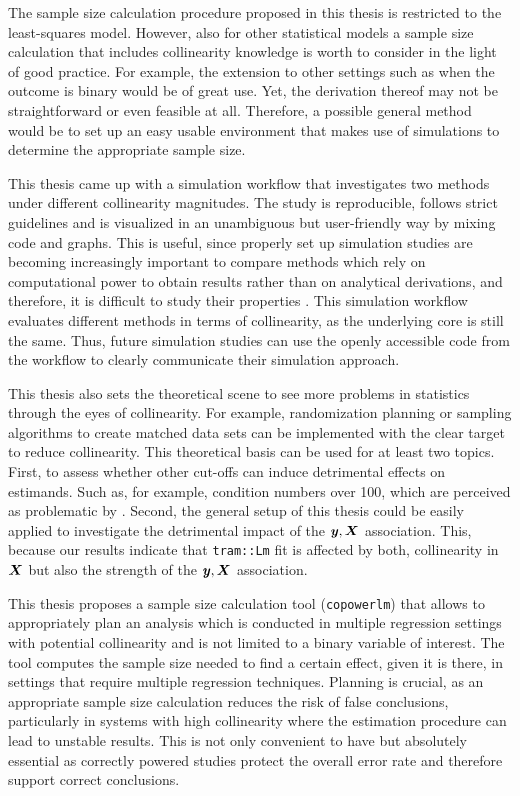 \documentclass[11pt,a4paper,twoside]{book}\usepackage[]{graphicx}\usepackage[]{xcolor}
\begin{document}
The sample size calculation procedure proposed in this thesis is restricted to the least-squares model.
However, also for other statistical models a sample size calculation that includes collinearity knowledge is worth to consider in the light of good practice.
For example, the extension to other settings such as when the outcome is binary would be of great use.
Yet, the derivation thereof may not be straightforward or even feasible at all.
Therefore, a possible general method would be to set up an easy usable environment that makes use of simulations to determine the appropriate sample size.

This thesis came up with a simulation workflow that investigates two methods under different collinearity magnitudes.
The study is reproducible, follows strict guidelines and is visualized in an unambiguous but user-friendly way by mixing code and graphs.
This is useful, since properly set up simulation studies are becoming increasingly important to compare methods which rely on computational power to obtain results rather than on analytical derivations, and therefore, it is difficult to study their properties \citep{Burton2006, Morris2019, pawel2022}.
This simulation workflow evaluates different methods in terms of collinearity, as the underlying core is still the same.
Thus, future simulation studies can use the openly accessible code from the workflow to clearly communicate their simulation approach.

This thesis also sets the theoretical scene to see more problems in statistics through the eyes of collinearity.
For example, randomization planning or sampling algorithms to create matched data sets can be implemented with the clear target to reduce collinearity.
This theoretical basis can be used for at least two topics.
First, to assess whether other cut-offs can induce detrimental effects on estimands.
Such as, for example, condition numbers over 100, which are perceived as problematic by \cite{montgomery}.
Second, the general setup of this thesis could be easily applied to investigate the detrimental impact of the ${\textbf{\textit{y}}},{\boldsymbol{X}}$ association.
This, because our results indicate that \texttt{tram::Lm} fit is affected by both, collinearity in ${\boldsymbol{X}}$ but also the strength of the ${\textbf{\textit{y}}},{\boldsymbol{X}}$ association.

This thesis proposes a sample size calculation tool (\texttt{copowerlm}) that allows to appropriately plan an analysis which is conducted in multiple regression settings with potential collinearity and is not limited to a binary variable of interest.
The tool computes the sample size needed to find a certain effect, given it is there, in settings that require multiple regression techniques.
Planning is crucial, as an appropriate sample size calculation reduces the risk of false conclusions, particularly in systems with high collinearity where the estimation procedure can lead to unstable results. 
This is not only convenient to have but absolutely essential as correctly powered studies protect the overall error rate and therefore support correct conclusions.
        
\end{document}
